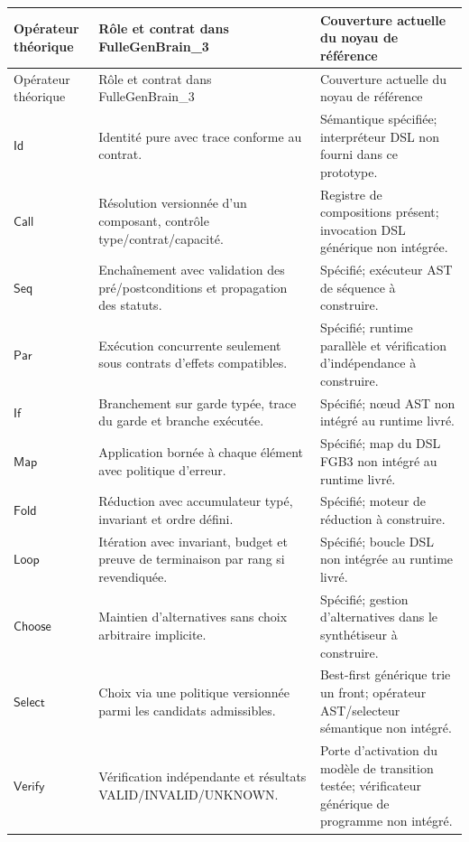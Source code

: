 \documentclass[11pt,a4paper]{article}
\begin{document}
\begin{longtable}{p{}p{}p{}}
\toprule Opérateur théorique & Rôle et contrat dans FulleGenBrain\_3 & Couverture actuelle du noyau de référence \\
\midrule
\endfirsthead
\toprule Opérateur théorique & Rôle et contrat dans FulleGenBrain\_3 & Couverture actuelle du noyau de référence \\
\midrule
\endhead
\(\mathsf{Id}\) & Identité pure avec trace conforme au contrat. & Sémantique spécifiée; interpréteur DSL non fourni dans ce prototype. \\
\(\mathsf{Call}\) & Résolution versionnée d'un composant, contrôle type/contrat/capacité. & Registre de compositions présent; invocation DSL générique non intégrée. \\
\(\mathsf{Seq}\) & Enchaînement avec validation des pré/postconditions et propagation des statuts. & Spécifié; exécuteur AST de séquence à construire. \\
\(\mathsf{Par}\) & Exécution concurrente seulement sous contrats d'effets compatibles. & Spécifié; runtime parallèle et vérification d'indépendance à construire. \\
\(\mathsf{If}\) & Branchement sur garde typée, trace du garde et branche exécutée. & Spécifié; nœud AST non intégré au runtime livré. \\
\(\mathsf{Map}\) & Application bornée à chaque élément avec politique d'erreur. & Spécifié; map du DSL FGB3 non intégré au runtime livré. \\
\(\mathsf{Fold}\) & Réduction avec accumulateur typé, invariant et ordre défini. & Spécifié; moteur de réduction à construire. \\
\(\mathsf{Loop}\) & Itération avec invariant, budget et preuve de terminaison par rang si revendiquée. & Spécifié; boucle DSL non intégrée au runtime livré. \\
\(\mathsf{Choose}\) & Maintien d'alternatives sans choix arbitraire implicite. & Spécifié; gestion d'alternatives dans le synthétiseur à construire. \\
\(\mathsf{Select}\) & Choix via une politique versionnée parmi les candidats admissibles. & Best-first générique trie un front; opérateur AST/selecteur sémantique non intégré. \\
\(\mathsf{Verify}\) & Vérification indépendante et résultats VALID/INVALID/UNKNOWN. & Porte d'activation du modèle de transition testée; vérificateur générique de programme non intégré. \\

\end{longtable}
\end{document}
